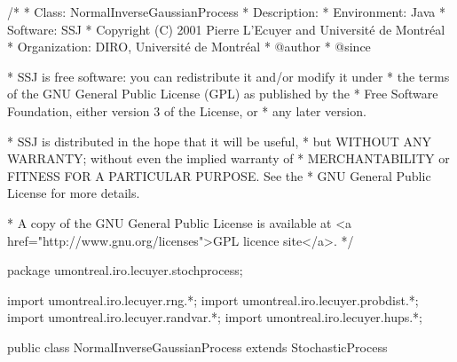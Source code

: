 \begin{code}
\begin{hide}
/*
 * Class:        NormalInverseGaussianProcess
 * Description:  
 * Environment:  Java
 * Software:     SSJ 
 * Copyright (C) 2001  Pierre L'Ecuyer and Université de Montréal
 * Organization: DIRO, Université de Montréal
 * @author       
 * @since

 * SSJ is free software: you can redistribute it and/or modify it under
 * the terms of the GNU General Public License (GPL) as published by the
 * Free Software Foundation, either version 3 of the License, or
 * any later version.

 * SSJ is distributed in the hope that it will be useful,
 * but WITHOUT ANY WARRANTY; without even the implied warranty of
 * MERCHANTABILITY or FITNESS FOR A PARTICULAR PURPOSE.  See the
 * GNU General Public License for more details.

 * A copy of the GNU General Public License is available at
   <a href="http://www.gnu.org/licenses">GPL licence site</a>.
 */
\end{hide}
package umontreal.iro.lecuyer.stochprocess;\begin{hide}
import umontreal.iro.lecuyer.rng.*;
import umontreal.iro.lecuyer.probdist.*;
import umontreal.iro.lecuyer.randvar.*;
import umontreal.iro.lecuyer.hups.*;

\end{hide}

public class NormalInverseGaussianProcess extends StochasticProcess \begin{hide} {
    protected RandomStream streamIG1;   // U[0,1) gen used in the inverse gaussian
    protected RandomStream streamIG2;   // U[0,1) gen used (maybe) in the inverse gaussian
    protected RandomStream streamBrownian;   // U[0,1) gen for the normal "Brownian"

    protected InverseGaussianProcess igProcess; 
    protected NormalGen normalGen;
    // Randomized time generated by the InverseGaussianProcess.
    protected double[] stochTime;
    double[] dt;
    double[] mudt;

    // Parameters of the normal inverse gaussian
    protected double mu;
    protected double delta;
    protected double alpha;
    protected double beta;
    protected double gamma;


\end{hide}
\end{code}
